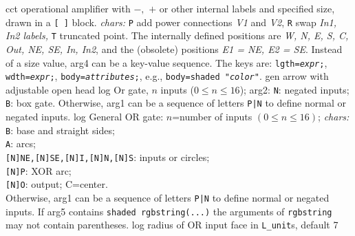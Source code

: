 %
  {cct}%
  {operational amplifier with $-,$ $+$ or other internal labels and
    specified size, drawn in a {\tt [ ]} block.
    {\sl chars:} {\tt P} add power connections {\sl V1} and {\sl V2},
    {\tt R} swap {\sl In1, In2 labels,} {\tt T} truncated point.  The internally
    defined positions are {\sl W, N, E, S, C, Out, NE, SE, In, In2}, and
    the (obsolete) positions {\sl E1 = NE, E2 = SE}. Instead of a size
    value, arg4 can be a key-value sequence.  The keys are:
    {\tt lgth={\sl expr};}, 
    {\tt wdth={\sl expr};}, 
    {\tt body={\sl attributes};}, e.g., {\tt body=shaded "{\sl color}"}. 
   }%
%
  {gen}%
  {arrow with adjustable open head}%
%
  {log}%
  {Or gate, $n$ inputs ($0 \leq n \leq 16$); arg2: {\tt N}: negated inputs;
   {\tt B}: box gate.
   Otherwise, arg1 can be a sequence of letters {\tt P|N} to define
   normal or negated inputs.
    }%
%
  {log}%
  {General OR gate: $n$=number of inputs $(0\leq n\leq 16)$;
    {\sl chars:}%
    {\tt B}: base and straight sides;\\ 
    {\tt A}: arcs;\\
    {\tt [N]NE,[N]SE,[N]I,[N]N,[N]S}: inputs or circles;\\ 
    {\tt [N]P}: XOR arc;\\
    {\tt [N]O}: output; C=center.\\
   Otherwise, arg1 can be a sequence of letters {\tt P|N} to define
   normal or negated inputs.  If arg5 contains {\tt shaded rgbstring(...)}
   the arguments of {\tt rgbstring} may not contain parentheses.}%
%
  {log}%
  {radius of OR input face in {\tt L\_unit}s, default 7}%

%

